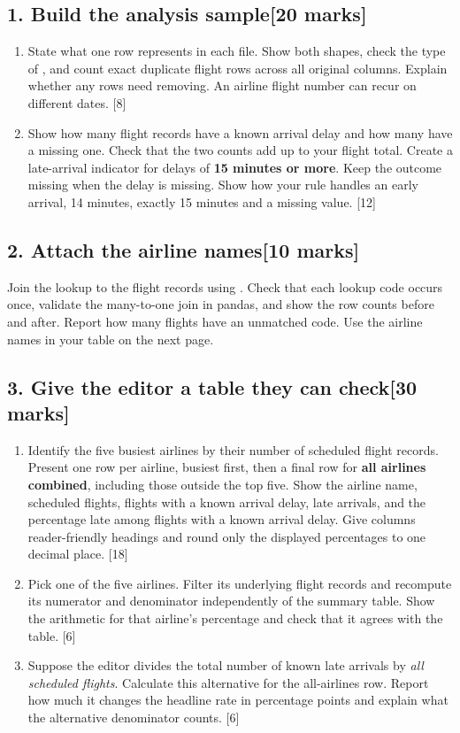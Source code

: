 \documentclass[11pt,a4paper]{article}
\newcommand{\py}[1]{\texttt{\detokenize{#1}}}
\newcommand{\task}[2]{\subsection*{#1\hfill{\normalsize[#2 marks]}}}
\begin{document}
\task{1. Build the analysis sample}{20}
\begin{enumerate}
\item State what one row represents in each file. Show both shapes, check the
type of \py{arr_delay}, and count exact duplicate flight rows across all original
columns. Explain whether any rows need removing. An airline flight number can
recur on different dates. \hfill [8]
\item Show how many flight records have a known arrival delay and how many have
a missing one. Check that the two counts add up to your flight total.
Create a late-arrival indicator for delays of \textbf{15 minutes or more}.
Keep the outcome missing when the delay is missing. Show how your rule handles
an early arrival, 14 minutes, exactly 15 minutes and a missing value. \hfill [12]
\end{enumerate}

\task{2. Attach the airline names}{10}
Join the lookup to the flight records using \py{carrier}. Check that each lookup
code occurs once, validate the many-to-one join in pandas, and show the row
counts before and after. Report how many flights have an unmatched code.
Use the airline names in your table on the next page.

\newpage
\task{3. Give the editor a table they can check}{30}
\begin{enumerate}
\item Identify the five busiest airlines by their number of scheduled flight
records. Present one row per airline, busiest first, then a final row for
\textbf{all airlines combined}, including those outside the top five.
Show the airline name, scheduled flights, flights with a known arrival delay,
late arrivals, and the percentage late among flights with a known arrival delay.
Give columns reader-friendly headings and round only the displayed percentages
to one decimal place. \hfill [18]
\item Pick one of the five airlines. Filter its underlying flight records and
recompute its numerator and denominator independently of the summary table.
Show the arithmetic for that airline's percentage and check that it agrees
with the table. \hfill [6]
\item Suppose the editor divides the total number of known late arrivals by
\emph{all scheduled flights}. Calculate this alternative for the all-airlines
row. Report how much it changes the headline rate in percentage points and
explain what the alternative denominator counts. \hfill [6]
\end{enumerate}
\end{document}

